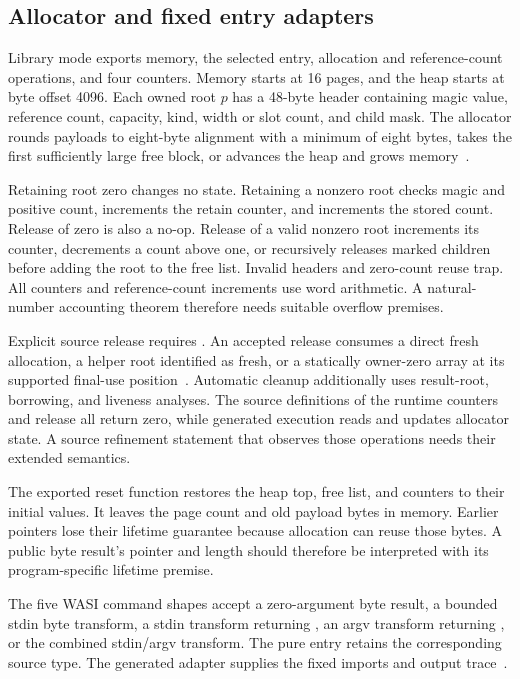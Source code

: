 \documentclass[11pt]{article}
\newcommand{\code}[1]{\texttt{\seqsplit{#1}}}
\begin{document}
\subsection{Allocator and fixed entry adapters}

Library mode exports memory, the selected entry, allocation and reference-count operations, and four counters.  Memory starts at 16 pages, and the heap starts at byte offset 4096.  Each owned root $p$ has a 48-byte header containing magic value, reference count, capacity, kind, width or slot count, and child mask.  The allocator rounds payloads to eight-byte alignment with a minimum of eight bytes, takes the first sufficiently large free block, or advances the heap and grows memory~\cite{binary}.

Retaining root zero changes no state.  Retaining a nonzero root checks magic and positive count, increments the retain counter, and increments the stored count.  Release of zero is also a no-op.  Release of a valid nonzero root increments its counter, decrements a count above one, or recursively releases marked children before adding the root to the free list.  Invalid headers and zero-count reuse trap.  All counters and reference-count increments use word arithmetic.  A natural-number accounting theorem therefore needs suitable overflow premises.

Explicit source release requires \code{validateModuleReleases}.  An accepted release consumes a direct fresh allocation, a helper root identified as fresh, or a statically owner-zero array at its supported final-use position~\cite{release}.  Automatic cleanup additionally uses result-root, borrowing, and liveness analyses.  The source definitions of the runtime counters and release all return zero, while generated execution reads and updates allocator state.  A source refinement statement that observes those operations needs their extended semantics.

The exported reset function restores the heap top, free list, and counters to their initial values.  It leaves the page count and old payload bytes in memory.  Earlier pointers lose their lifetime guarantee because allocation can reuse those bytes.  A public byte result's pointer and length should therefore be interpreted with its program-specific lifetime premise.

The five WASI command shapes accept a zero-argument byte result, a bounded stdin byte transform, a stdin transform returning \code{Except}, an argv transform returning \code{Except}, or the combined stdin/argv transform.  The pure entry retains the corresponding source type.  The generated adapter supplies the fixed imports and output trace~\cite{binary,specification}.
\end{document}
